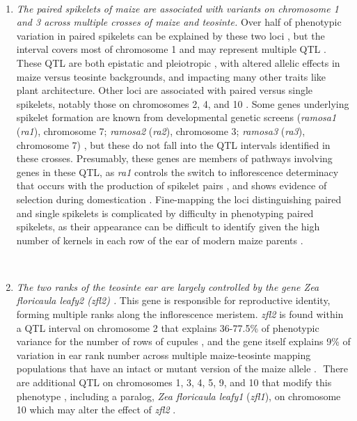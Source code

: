 \documentclass[a4paper]{article}
\newcommand{\mcs}[1]{\todo[size=\tiny, color=magenta!20]{#1}}
\begin{document}
﻿\begin{enumerate}

 \item \textit{The paired spikelets of maize are associated with variants on chromosome 1 and 3 across multiple crosses of maize and teosinte.}
 Over half of phenotypic variation in paired spikelets can be explained by these two loci \citep{doebley1991, doebley1993}, but the interval covers most of chromosome 1 and may represent multiple QTL \citep{doebley1993}.
 These QTL are both epistatic and pleiotropic \citep{doebley1995}, with altered allelic effects in maize versus teosinte backgrounds, and impacting many other traits like plant architecture.
 Other loci are associated with paired versus single spikelets, notably those on chromosomes 2, 4, and 10 \citep{doebley1991, doebley1993}. %
 Some genes underlying spikelet formation are known from developmental genetic screens (\textit{ramosa1} (\textit{ra1}), chromosome 7; \textit{ramosa2} (\textit{ra2}), chromosome 3; \textit{ramosa3} (\textit{ra3}), chromosome 7) \citep{vollbrecht2005, mcsteen2006}, but these do not fall into the QTL intervals identified in these crosses.
 Presumably, these genes are members of pathways involving genes in these QTL, as \textit{ra1} controls the switch to inflorescence determinacy that occurs with the production of spikelet pairs \citep{vollbrecht2005}, and shows evidence of selection during domestication \citep{sigmon2010}.
Fine-mapping the loci distinguishing paired and single spikelets is complicated by difficulty in phenotyping paired spikelets, as their appearance can be difficult to identify given the high number of kernels in each row of the ear of modern maize parents \citep{galinat1988}.


﻿ \item \textit{The two ranks of the teosinte ear are largely controlled by the gene \textit{Zea floricaula leafy2} (\textit{zfl2}) \citep{bomblies2006}. }
 This gene is responsible for reproductive identity, forming multiple ranks along the inflorescence meristem.
 \textit{zfl2} is found within a QTL interval on chromosome 2 that explains 36-77.5\% of phenotypic variance for the number of rows of cupules \citep{doebley1991, doebley1993}, and the gene itself explains 9\% of variation in ear rank number across multiple maize-teosinte mapping populations that have an intact or mutant version of the maize allele \citep{bomblies2006}.
 ﻿ There are additional QTL on chromosomes 1, 3, 4, 5, 9, and 10  that modify this phenotype \citep{doebley1991, doebley1993, briggs2007}, including a paralog, \textit{Zea floricaula leafy1} (\textit{zfl1}), on chromosome 10 \citep{briggs2007} which may alter the effect of \textit{zfl2} \citep{bomblies2006}.


\end{enumerate}
\end{document}
